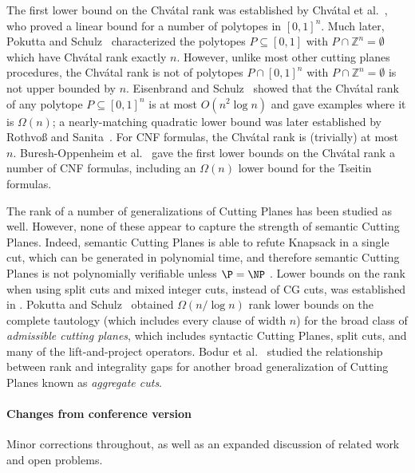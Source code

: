 \documentclass{toc}
\begin{document}
The first lower bound on the Chv\'{a}tal rank was established by Chv\'{a}tal et al.~\cite{ChvatalCH89}, who proved a linear bound for a number of polytopes in $[0,1]^n$. Much later, Pokutta and Schulz~\cite{PokuttaS11a} characterized the polytopes $P \subseteq [0,1]$ with $P \cap \mathbb{Z}^n = \emptyset$ which have Chv\'{a}tal rank exactly $n$. However, unlike most other cutting planes procedures, the Chv\'{a}tal rank is not of polytopes $P \cap [0,1]^n$ with $P \cap \mathbb{Z}^n = \emptyset$ is not upper bounded by $n$. Eisenbrand and Schulz~\cite{EisenbrandS99} showed that the Chv\'{a}tal rank of any polytope $P \subseteq [0,1]^n$ is at most $O(n^2 \log n)$ and gave examples where it is $\Omega(n)$; a nearly-matching quadratic lower bound was later established by Rothvo{\ss} and Sanita~\cite{RothvossS13}.
For CNF formulas, the Chv\'{a}tal rank is (trivially) at most $n$. Buresh-Oppenheim et al.~\cite{BGHMP06} gave the first lower bounds on the Chv\'{a}tal rank  a number of CNF formulas, including an $\Omega(n)$ lower bound for the Tseitin formulas. 

The rank of a number of generalizations of Cutting Planes has been studied as well. However, none of these appear to capture the strength of semantic Cutting Planes. %
Indeed, semantic Cutting Planes is able to refute Knapsack in a single cut, which can be generated
%
in polynomial time,  %
and therefore semantic Cutting Planes is not polynomially verifiable unless $\P = \NP$ \cite{FilmusHL16}.
%
%
Lower bounds on the rank when using split cuts and mixed integer cuts, instead of CG cuts, was established in \cite{CornuejolsL02a}.  
Pokutta and Schulz~\cite{PokuttaS10} obtained $\Omega(n/\log n)$ rank lower bounds on the complete tautology (which includes every clause of width $n$) for the broad class of \emph{admissible cutting planes}, which includes syntactic Cutting Planes, split cuts, and many of the lift-and-project operators. Bodur et al.~\cite{BodurPDMP18} studied the relationship between rank and integrality gaps for another broad generalization of Cutting Planes known as \emph{aggregate cuts}. 

%
\paragraph{Changes from conference version \cite{conf-version}}

Minor corrections throughout, as well as an expanded discussion of related work and open problems.
\end{document}
